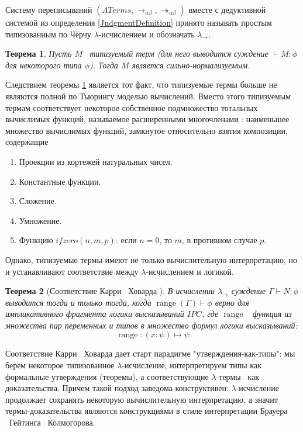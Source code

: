 \documentclass{article}[12pt]
\newtheorem{theorem}{Теорема}
\newcommand{\dash}{\textemdash\ }
\begin{document}
Систему переписываний $(\Lambda Terms, \rightarrow_{\alpha \beta}, \twoheadrightarrow_{\alpha \beta})$
вместе с дедуктивной системой из определения \ref{JudgmentDefinition} принято называть
простым типизованным по Чёрчу $\lambda$-исчислением и обозначать $\lambda_\rightarrow$.

\begin{theorem}
    \label{SimplyTypedStrongNormaliztionTheorem}
    Пусть $M$ \dash типизуемый терм (для него выводится суждение $\vdash M : \phi$ для некоторого типа $\phi$).
    Тогда $M$ является сильно-нормализуемым.
\end{theorem}

Следствием теоремы \ref{SimplyTypedStrongNormaliztionTheorem} является тот факт, что типизуемые термы
больше не являются полной по Тьюрингу моделью вычислений. Вместо этого типизуемым термам
соответствует некоторое собственное подмножество тотальных вычислимых функций, называемое расширенными
многочленами \cite{Zakr07}: наименьшее множество вычислимых функций,
замкнутое относительно взятия композиции, содержащие
\begin{enumerate}
    \item Проекции из кортежей натуральных чисел.
    \item Константные функции.
    \item Сложение.
    \item Умножение.
    \item Функцию $ifzero(n, m, p)$: если $n = 0$, то $m$, в противном случае $p$.
\end{enumerate}

Однако, типизуемые термы имеют не только вычислительную интерпретацию,
но и устанавливают соответствие между $\lambda$-исчислением и логикой.

\begin{theorem}[Соответствие Карри \dash Ховарда \cite{SorUrz06}]
    \label{CarryHowardTheorem}
    В исчислении $\lambda_\rightarrow$ суждение $\Gamma \vdash N : \phi$ выводится тогда и только
    тогда, когда $\operatorname{range}(\Gamma) \vdash \phi$ верно для импликативного фрагмента логики высказываний $IPC$,
    где $\operatorname{range}$ \dash функция из множества пар переменных и типов в множество формул логики высказываний:
    $$\operatorname{range} : (x : \psi) \mapsto \psi$$
\end{theorem}

Соответствие Карри \dash Ховарда дает старт парадигме "утверждения-как-типы": мы берем некоторое типизованное
$\lambda$-исчисление, интерпретируем типы как формальные утверждения (теоремы), а соответствующие
$\lambda$-термы \dash как доказательства. Причем такой подход заведома конструктивен: $\lambda$-исчисление
продолжает сохранять некоторую вычислительную интерпретацию, а значит термы-доказательства
являются конструкциями в стиле интерпретации Брауера \dash Гейтинга \dash Колмогорова.
\end{document}
